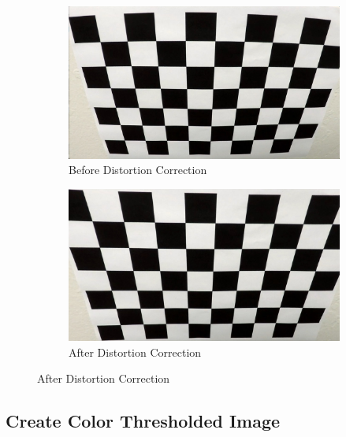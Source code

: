\documentclass{article}
\begin{document}
\begin{figure}
     \centering
     \begin{subfigure}[b]{0.4\textwidth}
         \centering
         \includegraphics[width=\textwidth]{../camera_cal/calibration2.jpg}
         \caption{Before Distortion Correction}
         \label{fig1a}
     \end{subfigure}
     \hfill
     \begin{subfigure}[b]{0.4\textwidth}
         \centering
         \includegraphics[width=\textwidth]{../output_images/undistort/alibration2.jpg}
         \caption{After Distortion Correction}
         \label{fig1b}
     \end{subfigure}
\end{figure}
\subsection{Create Color Thresholded Image} 
\end{document}
